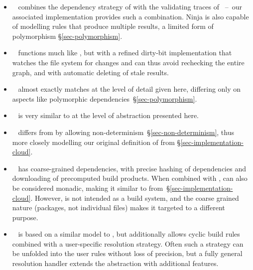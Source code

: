 \begin{itemize}
\item \Ninja~\cite{ninja} combines the dependency strategy of \Make with the
validating traces of \Shake~--~our associated implementation provides such a
combination. Ninja is also capable of modelling rules that produce multiple
results, a limited form of polymorphism \S\ref{sec-polymorphism}.

\item \Tup~\cite{tup} functions much like \Make, but with a refined dirty-bit
implementation that watches the file system for changes and can thus avoid
rechecking the entire graph, and with automatic deleting of stale results.

\item \Redo~\cite{redo} almost exactly matches \Shake at the level of detail
given here, differing only on aspects like polymorphic
dependencies~\S\ref{sec-polymorphism}.

\item \Buck~\cite{buck} is very similar to \Bazel at the level of abstraction presented here.

\item \CloudBuild~\cite{esfahani2016cloudbuild}
differs from \Bazel by allowing non-determinism~\S\ref{sec-non-determinism}, thus more closely modelling
our original definition of \Bazel from \S\ref{sec-implementation-cloud}.

\item \Nix~\cite{dolstra2004nix} has coarse-grained dependencies, with precise
hashing of dependencies and downloading of precomputed build products. When
combined with , \Nix can also be considered monadic,
making it similar to \Cloud \Shake
from~\S\ref{sec-implementation-cloud}.
However, \Nix is not intended as a build system, and the coarse grained nature
(packages, not individual files) makes it targeted to a different purpose.

\item \Pluto~\cite{erdweg2015pluto} is based on a similar model to \Shake, but
additionally allows cyclic build rules combined with a user-specific resolution
strategy. Often such a strategy can be unfolded into the user rules without loss
of precision, but a fully general resolution handler extends the 
abstraction with additional features.
\end{itemize}

